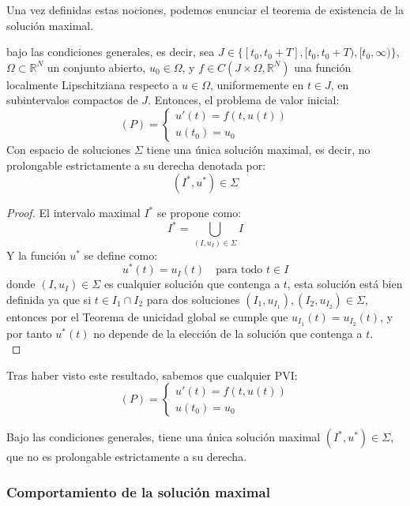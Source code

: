 Una vez definidas estas nociones, podemos enunciar el teorema de existencia de la solución maximal.

\begin{teorema}
    bajo las condiciones generales, es decir, sea $J \in \{ [t_0, t_0 + T], [t_0, t_0 + T), [t_0, \infty) \}$, $\Omega \subset \mathbb{R}^N$ un conjunto abierto, $u_0 \in \Omega$, y $f \in C(J \times \Omega, \mathbb{R}^N)$ una función localmente Lipschitziana respecto a $u \in \Omega$, uniformemente en $t \in J$, en subintervalos compactos de $J$. Entonces, el problema de valor inicial:
    \[
        (P) =
        \begin{cases}
            u'(t) = f(t, u(t)) \\
            u(t_0) = u_0
        \end{cases}
    \]
    Con espacio de soluciones $\Sigma$ tiene una única solución maximal, es decir, no prolongable estrictamente a su derecha denotada por:
    \[  
        \boxed{(I^*, u^*) \in \Sigma}
    \]
\end{teorema}

\begin{proof}
    El intervalo maximal $I^*$ se propone como:
    \[
        I^* = \bigcup_{(I, u_I) \in \Sigma} I
    \]
    Y la función $u^*$ se define como:
    \[
        u^*(t) = u_I(t) \quad \text{para todo } t \in I
    \]
    donde $(I, u_I) \in \Sigma$ es cualquier solución que contenga a $t$, esta solución está bien definida ya que si $t \in I_1 \cap I_2$ para dos soluciones $(I_1, u_{I_1}), (I_2, u_{I_2}) \in \Sigma$, entonces por el Teorema de unicidad global se cumple que $u_{I_1}(t) = u_{I_2}(t)$, y por tanto $u^*(t)$ no depende de la elección de la solución que contenga a $t$.\\
\end{proof}

Tras haber visto este resultado, sabemos que cualquier PVI:
\[
    (P) =
    \begin{cases}
        u'(t) = f(t, u(t)) \\
        u(t_0) = u_0
    \end{cases}
\]

Bajo las condiciones generales, tiene una única solución maximal $(I^*, u^*) \in \Sigma$, que no es prolongable estrictamente a su derecha.

\subsubsection{Comportamiento de la solución maximal}

